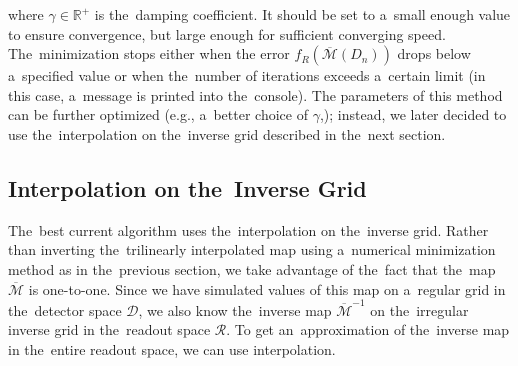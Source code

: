 			where $\gamma\in\mathbb{R}^+$ is the~damping coefficient. It should be set to a~small enough value to ensure convergence, but large enough for sufficient converging speed. The~minimization stops either when the error $f_R(\overbar{\mathcal{M}}(D_n))$ drops below a~specified value or when the~number of iterations exceeds a~certain limit (in this case, a~message is printed into the~console).
			The parameters of this method can be further optimized (e.g., a~better choice of $\gamma$,); instead, we later decided to use the~interpolation on the~inverse grid described in the~next section.
			
		
		\subsection{Interpolation on the~Inverse Grid}
		\label{sec:interpol}			
			
			The~best current algorithm uses the~interpolation on the~inverse grid. Rather than inverting the~trilinearly interpolated map using a~numerical minimization method as in the~previous section, we take advantage of the~fact that the~map $\overbar{\mathcal{M}}$ is one-to-one. Since we have simulated values of this map on a~regular grid in the~detector space $\mathcal{D}$, we also know the~inverse map $\overbar{\mathcal{M}}^{-1}$ on the~irregular inverse grid in the~readout space $\mathcal{R}$. To get an~approximation of the~inverse map in the~entire readout space, we can use interpolation.
			
